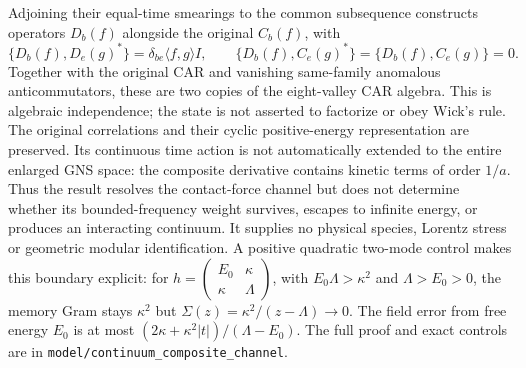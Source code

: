 Adjoining their equal-time smearings to the common subsequence constructs
operators $D_b(f)$ alongside the original $C_b(f)$, with
\[
 \{D_b(f),D_e(g)^*\}=\delta_{be}\langle f,g\rangle I,
 \qquad
 \{D_b(f),C_e(g)^*\}=\{D_b(f),C_e(g)\}=0.
\]
Together with the original CAR and vanishing same-family anomalous
anticommutators, these are two copies of the eight-valley CAR algebra.
This is algebraic independence; the state is not asserted to factorize
or obey Wick's rule. The original correlations and their cyclic
positive-energy representation are preserved. Its continuous time
action is not automatically extended to the entire enlarged GNS space:
the composite derivative contains kinetic terms of order $1/a$.
Thus the result resolves the contact-force channel but does not determine
whether its bounded-frequency weight survives, escapes to infinite
energy, or produces an interacting continuum. It supplies no physical
species, Lorentz stress or geometric modular identification. A positive quadratic two-mode control makes this boundary explicit:
for $h=\left(\begin{smallmatrix}E_0&\kappa\\\kappa&\Lambda\end{smallmatrix}\right)$,
with $E_0\Lambda>\kappa^2$ and $\Lambda>E_0>0$, the memory Gram stays
$\kappa^2$ but $\Sigma(z)=\kappa^2/(z-\Lambda)\to0$.
The field error from free energy $E_0$ is at most
$(2\kappa+\kappa^2|t|)/(\Lambda-E_0)$.
The full proof and exact controls are in \texttt{model/continuum\_composite\_channel}.
